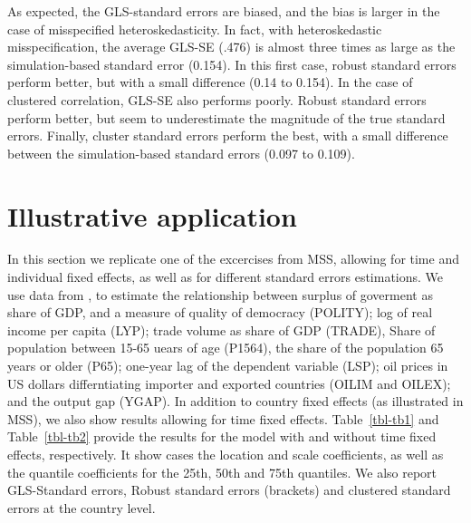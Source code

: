 \documentclass[
  authoryear,
  review,
  1p]{elsarticle}
\begin{document}
As expected, the GLS-standard errors are biased, and the bias is larger
in the case of misspecified heteroskedasticity. In fact, with
heteroskedastic misspecification, the average GLS-SE (.476) is almost
three times as large as the simulation-based standard error (0.154). In
this first case, robust standard errors perform better, but with a small
difference (0.14 to 0.154). In the case of clustered correlation, GLS-SE
also performs poorly. Robust standard errors perform better, but seem to
underestimate the magnitude of the true standard errors. Finally,
cluster standard errors perform the best, with a small difference
between the simulation-based standard errors (0.097 to 0.109).

\section{Illustrative application}\label{illustrative-application}

In this section we replicate one of the excercises from MSS, allowing
for time and individual fixed effects, as well as for different standard
errors estimations. We use data from \citet{persson_economic_2005}, to
estimate the relationship between surplus of goverment as share of GDP,
and a measure of quality of democracy (POLITY); log of real income per
capita (LYP); trade volume as share of GDP (TRADE), Share of population
between 15-65 uears of age (P1564), the share of the population 65 years
or older (P65); one-year lag of the dependent variable (LSP); oil prices
in US dollars differntiating importer and exported countries (OILIM and
OILEX); and the output gap (YGAP). In addition to country fixed effects
(as illustrated in MSS), we also show results allowing for time fixed
effects. Table~\ref{tbl-tb1} and Table~\ref{tbl-tb2} provide the results
for the model with and without time fixed effects, respectively. It show
cases the location and scale coefficients, as well as the quantile
coefficients for the 25th, 50th and 75th quantiles. We also report
GLS-Standard errors, Robust standard errors (brackets) and clustered
standard errors at the country level.
\end{document}
